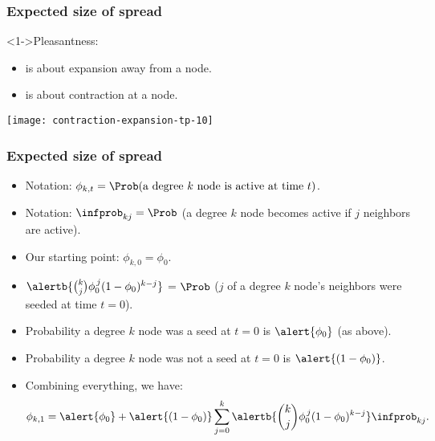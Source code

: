 \begin{frame}
  \frametitle{Expected size of spread}

  \begin{block}<1->{Pleasantness:}
    \begin{itemize}
    \item<1-> 
       is about \alert{expansion} away from
      a node.
    \item<2-> 
       is about \alert{contraction} at
      a node.
    \end{itemize}
    \texttt{[image: contraction-expansion-tp-10]}
  \end{block}

\end{frame}

\begin{frame}
  \small

  \frametitle{Expected size of spread}

  \begin{block}{}
  \begin{itemize}
  \item<1->
    \alert{Notation:}
    $ \phi_{k,t} = 
    \Prob(\mbox{a degree $k$ node is active at time $t$}) $.
  \item<2->
    \alert{Notation:}
    $\infprob_{k j} = \Prob$ (a degree $k$ node becomes active
    if $j$ neighbors are active).
  \item<3-> 
    Our starting point: $ \phi_{k,0} = \phi_0$.
  \item<4->
    $ 
    \alertb{\binom{k}{j}
      \phi_0^{\, j}
      (1-\phi_0)^{k-j} }
    $ 
    =
    $\Prob$ ($j$ of a degree $k$ node's neighbors were seeded at time $t=0$).
  \item<5-> 
    Probability a degree $k$ node was a seed at $t=0$ is $\alert{\phi_0}$ (as above).
  \item<6-> 
    Probability a degree $k$ node was not a seed at $t=0$ is $\alert{(1-\phi_0)}$.
  \item<7-> 
    Combining everything, we have:
    $$ 
    \phi_{k,1}
    = 
    \alert{\phi_{0}}
    + 
    \alert{(1-\phi_{0})}
    \sum_{j=0}^{k}
    \alertb{\binom{k}{j}
    \phi_0^{\, j}
    (1-\phi_0)^{k-j} }
  \infprob_{k j}.
    $$
  \end{itemize}
  \end{block}

\end{frame}

